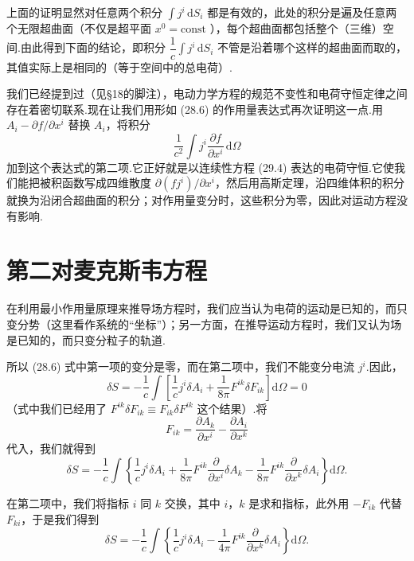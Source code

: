 上面的证明显然对任意两个积分 $\int j^i\,\mathrm{d}S_i$
都是有效的，此处的积分是遍及任意两个无限超曲面（不仅是超平面 $x^0=\mathrm{const}$
），每个超曲面都包括整个（三维）空间.由此得到下面的结论，即积分
$\dfrac{1}{c}\int j^i\,\mathrm{d}S_i$
不管是沿着哪个这样的超曲面而取的，其值实际上是相同的（等于空间中的总电荷）.

我们已经提到过（见§18的脚注），电动力学方程的规范不变性和电荷守恒定律之间存在着密切联系.现在让我们用形如
(28.6) 的作用量表达式再次证明这一点.用 $A_i-\partial f/\partial x^i$ 替换 $A_i$，将积分
\begin{equation*}
  \frac{1}{c^2}\int j^i\frac{\partial f}{\partial x^i}\,\mathrm{d}\varOmega
\end{equation*}
加到这个表达式的第二项.它正好就是以连续性方程 (29.4) 表达的电荷守恒.它使我们能把被积函数写成四维散度
$\partial(fj^i)/\partial x^i$，然后用高斯定理，沿四维体积的积分就换为沿闭合超曲面的积分；对作用量变分时，这些积分为零，因此对运动方程没有影响.

\section{第二对麦克斯韦方程}

在利用最小作用量原理来推导场方程时，我们应当认为电荷的运动是已知的，而只变分势（这里看作系统的“坐标”）；另一方面，在推导运动方程时，我们又认为场是已知的，而只变分粒子的轨道.

所以 (28.6) 式中第一项的变分是零，而在第二项中，我们不能变分电流 $j^i$.因此，
\begin{equation*}
  \delta S=-\frac{1}{c}\int\left[\frac{1}{c}j^i\delta A_i
  +\frac{1}{8\pi}F^{ik}\delta F_{ik}\right]\mathrm{d}\varOmega=0
\end{equation*}
（式中我们已经用了 $F^{ik}\delta F_{ik}\equiv F_{ik}\delta F^{ik}$ 这个结果）.将
\begin{equation*}
  F_{ik}=\frac{\partial A_k}{\partial x^i}-\frac{\partial A_i}{\partial x^k}
\end{equation*}
代入，我们就得到
\begin{equation*}
  \delta S=-\frac{1}{c}\int\left\{\frac{1}{c}j^i\delta A_i
  +\frac{1}{8\pi}F^{ik}\frac{\partial}{\partial x^i}\delta A_k
  -\frac{1}{8\pi}F^{ik}\frac{\partial}{\partial x^k}\delta A_i\right\}\mathrm{d}\varOmega.
\end{equation*}

在第二项中，我们将指标 $i$ 同 $k$ 交换，其中 $i$，$k$ 是求和指标，此外用 $-F_{ik}$ 代替
$F_{ki}$，于是我们得到
\begin{equation*}
  \delta S=-\frac{1}{c}\int\left\{\frac{1}{c}j^i\delta A_i
  -\frac{1}{4\pi}F^{ik}\frac{\partial}{\partial x^k}\delta A_i\right\}\mathrm{d}\varOmega.
\end{equation*}

